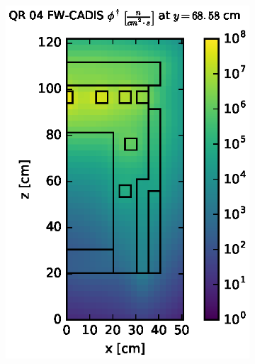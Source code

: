 \begin{figure}[!htb]
\centering
\begin{subfigure}{0.4\textwidth}
\includegraphics[max height=0.445\textheight]
{img/dlvn-plots/fwc-adj/flux-qr04-slice.eps}
\end{subfigure} ~
\begin{subfigure}{0.4\textwidth}

\end{subfigure}
\end{figure}
